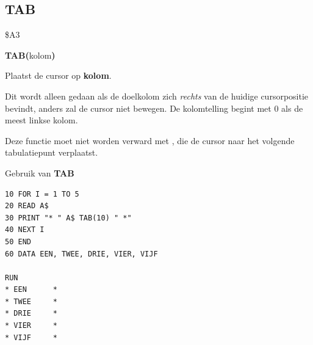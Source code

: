 \subsection{TAB}
\begin{description}[leftmargin=2cm,style=nextline]
\item [Token:]    \$A3

\item [Formaat:]   {\bf TAB(}kolom{\bf)}

\item [Retourneert:]  Plaatst de cursor op {\bf kolom}.

                  Dit wordt alleen gedaan als de doelkolom zich {\it rechts} van de huidige cursorpositie bevindt, anders zal de cursor niet bewegen. De kolomtelling begint met 0 als de meest linkse kolom.

\item [Opmerkingen:]  Deze functie moet niet worden verward met , die de cursor naar het volgende tabulatiepunt verplaatst.

\item [Voorbeeld:]  Gebruik van {\bf TAB}

\begin{tcolorbox}[colback=black,coltext=white]
\verbatimfont{\codefont}
\begin{verbatim}
10 FOR I = 1 TO 5
20 READ A$
30 PRINT "* " A$ TAB(10) " *"
40 NEXT I
50 END
60 DATA EEN, TWEE, DRIE, VIER, VIJF

RUN
* EEN      *
* TWEE     *
* DRIE     *
* VIER     *
* VIJF     *
\end{verbatim}
\end{tcolorbox}
\end{description}


\newpage
